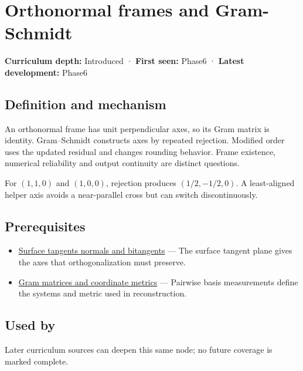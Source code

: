 \hypertarget{appendix-c39f1ed34271}{}\label{referencestart:appendix-c39f1ed34271}
\section{Orthonormal frames and Gram-Schmidt}\label{appendix-c39f1ed34271-orthonormal-frames-and-gram-schmidt}

\textbf{Curriculum depth:} Introduced · \textbf{First seen:} Phase6 · \textbf{Latest development:} Phase6

\subsection{Definition and mechanism}\label{appendix-c39f1ed34271-definition-and-mechanism}

An orthonormal frame has unit perpendicular axes, so its Gram matrix is identity. Gram--Schmidt constructs axes by repeated rejection. Modified order uses the updated residual and changes rounding behavior. Frame existence, numerical reliability and output continuity are distinct questions.

For \((1,1,0)\) and \((1,0,0)\), rejection produces \((1/2,-1/2,0)\). A least-aligned helper axis avoids a near-parallel cross but can switch discontinuously.

\subsection{Prerequisites}\label{appendix-c39f1ed34271-prerequisites}

\begin{itemize}
\tightlist
\item
  \hyperref[appendix-e31893dec985]{Surface tangents normals and bitangents} --- The surface tangent plane gives the axes that orthogonalization must preserve.
\item
  \hyperref[appendix-3b863809f82a]{Gram matrices and coordinate metrics} --- Pairwise basis measurements define the systems and metric used in reconstruction.
\end{itemize}

\subsection{Used by}\label{appendix-c39f1ed34271-used-by}

Later curriculum sources can deepen this same node; no future coverage is marked complete.

